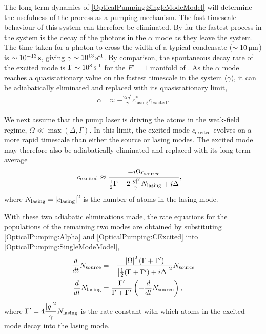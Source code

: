 The long-term dynamics of \eqref{OpticalPumping:SingleModeModel} will determine the usefulness of the process as a pumping mechanism.  The fast-timescale behaviour of this system can therefore be eliminated.  By far the fastest process in the system is the decay of the photons in the $\alpha$ mode as they leave the system.  The time taken for a photon to cross the width of a typical condensate ($\sim\unit[10]{\micro m}$) is $\sim\unit[10^{-13}]{s}$, giving $\gamma \sim \unit[10^{13}]{s\textsuperscript{-1}}$.  By comparison, the spontaneous decay rate of the excited mode is $\Gamma \sim \unit[10^8]{s\textsuperscript{-1}}$ for the $F'=1$ manifold of .  As the $\alpha$ mode reaches a quasistationary value on the fastest timescale in the system ($\gamma$), it can be adiabatically eliminated and replaced with its quasistationary limit,
\begin{align}
    \alpha & \approx -\frac{2 i g^*}{\gamma} c_\text{lasing}^* c_\text{excited}. \label{OpticalPumping:Alpha}
\end{align}

We next assume that the pump laser is driving the atoms in the weak-field regime, $\Omega \ll \max\left(\Delta, \Gamma\right)$.  In this limit, the excited mode $c_\text{excited}$ evolves on a more rapid timescale than either the source or lasing modes.  The excited mode may therefore also be adiabatically eliminated and replaced with its long-term average
\begin{align}
    c_\text{excited} &\approx \frac{-i \Omega c_\text{source}}{\frac{1}{2}\Gamma + 2 \frac{\abs{g}^2}{\gamma} N_\text{lasing} + i \Delta}, \label{OpticalPumping:CExcited}
\end{align}
where $N_\text{lasing} = \left|c_\text{lasing}\right|^2$ is the number of atoms in the lasing mode.

With these two adiabatic eliminations made, the rate equations for the populations of the remaining two modes are obtained by substituting \eqref{OpticalPumping:Alpha} and \eqref{OpticalPumping:CExcited} into \eqref{OpticalPumping:SingleModeModel},
\begin{subequations}
    \label{OpticalPumping:SingleModeRateEquations}
    \begin{align}
        \frac{d}{dt} N_\text{source} &= - \frac{\abs{\Omega}^2 \left(\Gamma + \Gamma'\right)}{\abs{\frac{1}{2}(\Gamma + \Gamma') + i \Delta}^2} N_\text{source}\\
        \frac{d}{dt} N_\text{lasing} &= \frac{\Gamma'}{\Gamma + \Gamma'} \left( - \frac{d}{dt} N_\text{source}\right),
    \end{align}
\end{subequations}
where $\displaystyle \Gamma' = 4 \frac{\left|g\right|^2}{\gamma} N_\text{lasing}$ is the rate constant with which atoms in the excited mode decay into the lasing mode.

